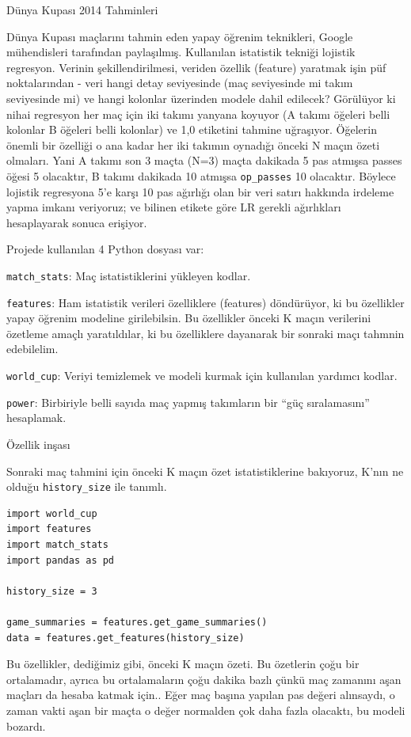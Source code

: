 \documentclass[12pt,fleqn]{article}\usepackage{../../common}
\begin{document}
Dünya Kupası 2014 Tahminleri

Dünya Kupası maçlarını tahmin eden yapay öğrenim teknikleri, Google
mühendisleri tarafından paylaşılmış. Kullanılan istatistik tekniği lojistik
regresyon. Verinin şekillendirilmesi, veriden özellik (feature) yaratmak
işin püf noktalarından - veri hangi detay seviyesinde (maç seviyesinde mi
takım seviyesinde mi) ve hangi kolonlar üzerinden modele dahil edilecek?
Görülüyor ki nihai regresyon her maç için iki takımı yanyana koyuyor (A
takımı öğeleri belli kolonlar B öğeleri belli kolonlar) ve 1,0 etiketini
tahmine uğraşıyor. Öğelerin önemli bir özelliği o ana kadar her iki takımın
oynadığı önceki N maçın özeti olmaları. Yani A takımı son 3 maçta (N=3)
maçta dakikada 5 pas atmışsa passes öğesi 5 olacaktır, B takımı dakikada 10
atmışsa \verb!op_passes! 10 olacaktır. Böylece lojistik regresyona 5'e
karşı 10 pas ağırlığı olan bir veri satırı hakkında irdeleme yapma imkanı
veriyoruz; ve bilinen etikete göre LR gerekli ağırlıkları hesaplayarak
sonuca erişiyor.

Projede kullanılan 4 Python dosyası var: 

\verb!match_stats!: Maç istatistiklerini yükleyen kodlar.

\verb!features!: Ham istatistik verileri özelliklere (features) döndürüyor,
ki bu özellikler yapay öğrenim modeline girilebilsin. Bu özellikler önceki
K maçın verilerini özetleme amaçlı yaratıldılar, ki bu özelliklere
dayanarak bir sonraki maçı tahmnin edebilelim.

\verb!world_cup!: Veriyi temizlemek ve modeli kurmak için kullanılan
yardımcı kodlar.

\verb!power!: Birbiriyle belli sayıda maç yapmış takımların bir ``güç
sıralamasını'' hesaplamak. 

Özellik inşası

Sonraki maç tahmini için önceki K maçın özet istatistiklerine bakıyoruz, K'nın
ne olduğu \verb!history_size! ile tanımlı.

\begin{verbatim}
import world_cup
import features
import match_stats
import pandas as pd

history_size = 3

game_summaries = features.get_game_summaries()
data = features.get_features(history_size)
\end{verbatim}

Bu özellikler, dediğimiz gibi, önceki K maçın özeti. Bu özetlerin çoğu bir
ortalamadır, ayrıca bu ortalamaların çoğu dakika bazlı çünkü maç zamanını
aşan maçları da hesaba katmak için.. Eğer maç başına yapılan pas değeri
alınsaydı, o zaman vakti aşan bir maçta o değer normalden çok daha fazla
olacaktı, bu modeli bozardı.
\end{document}
